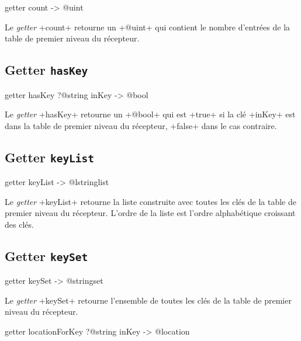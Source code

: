 \begin{galgas3}
getter count -> @uint
\end{galgas3}


Le \emph{getter} \ggst+count+ retourne un \ggst+@uint+ qui contient le nombre d'entrées de la table de premier niveau du récepteur.



\subsection{Getter \texttt{hasKey}}

\begin{galgas3}
getter hasKey ?@string inKey -> @bool
\end{galgas3}


Le \emph{getter} \ggst+hasKey+ retourne un \ggst+@bool+ qui est \ggst+true+ si la clé \ggst+inKey+ est dans la table de premier niveau du récepteur, \ggst+false+ dans le cas contraire.



\subsection{Getter \texttt{keyList}}

\begin{galgas3}
getter keyList -> @lstringlist
\end{galgas3}


Le \emph{getter} \ggst+keyList+ retourne la liste construite avec toutes les clés de la table de premier niveau du récepteur. L'ordre de la liste est l'ordre alphabétique croissant des clés.



\subsection{Getter \texttt{keySet}}

\begin{galgas3}
getter keySet -> @stringset
\end{galgas3}


Le \emph{getter} \ggst+keySet+ retourne l'ensemble de toutes les clés de la table de premier niveau du récepteur.






\begin{galgas3}
getter locationForKey ?@string inKey -> @location
\end{galgas3}


